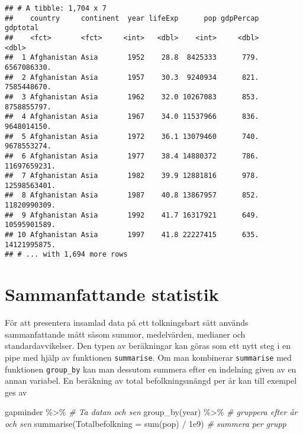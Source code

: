 \documentclass[
]{book}
\newenvironment{Shaded}{\begin{snugshade}}{\end{snugshade}}
\newcommand{\AttributeTok}[1]{\textcolor[rgb]{0.77,0.63,0.00}{#1}}
\newcommand{\CommentTok}[1]{\textcolor[rgb]{0.56,0.35,0.01}{\textit{#1}}}
\newcommand{\FloatTok}[1]{\textcolor[rgb]{0.00,0.00,0.81}{#1}}
\newcommand{\FunctionTok}[1]{\textcolor[rgb]{0.00,0.00,0.00}{#1}}
\newcommand{\NormalTok}[1]{#1}
\newcommand{\SpecialCharTok}[1]{\textcolor[rgb]{0.00,0.00,0.00}{#1}}
\theoremstyle{definition}
\theoremstyle{definition}
\theoremstyle{definition}
\theoremstyle{definition}
\theoremstyle{remark}
\begin{document}
\begin{verbatim}
## # A tibble: 1,704 x 7
##    country     continent  year lifeExp      pop gdpPercap     gdptotal
##    <fct>       <fct>     <int>   <dbl>    <int>     <dbl>        <dbl>
##  1 Afghanistan Asia       1952    28.8  8425333      779.  6567086330.
##  2 Afghanistan Asia       1957    30.3  9240934      821.  7585448670.
##  3 Afghanistan Asia       1962    32.0 10267083      853.  8758855797.
##  4 Afghanistan Asia       1967    34.0 11537966      836.  9648014150.
##  5 Afghanistan Asia       1972    36.1 13079460      740.  9678553274.
##  6 Afghanistan Asia       1977    38.4 14880372      786. 11697659231.
##  7 Afghanistan Asia       1982    39.9 12881816      978. 12598563401.
##  8 Afghanistan Asia       1987    40.8 13867957      852. 11820990309.
##  9 Afghanistan Asia       1992    41.7 16317921      649. 10595901589.
## 10 Afghanistan Asia       1997    41.8 22227415      635. 14121995875.
## # ... with 1,694 more rows
\end{verbatim}

\hypertarget{sammanfattande-statistik}{%
\section{Sammanfattande statistik}\label{sammanfattande-statistik}}

För att presentera insamlad data på ett tolkningsbart sätt används sammanfattande mått såsom summor, medelvärden, medianer och standardavvikelser.
Den typen av beräkningar kan göras som ett nytt steg i en pipe med hjälp av funktionen \texttt{summarise}. Om man kombinerar \texttt{summarise} med funktionen \texttt{group\_by} kan man dessutom summera efter en indelning given av en annan variabel. En beräkning av total befolkningsmängd per år kan till exempel ges av

\begin{Shaded}
\begin{Highlighting}[]
\NormalTok{gapminder }\SpecialCharTok{\%\textgreater{}\%}                           \CommentTok{\# Ta datan och sen}
  \FunctionTok{group\_by}\NormalTok{(year) }\SpecialCharTok{\%\textgreater{}\%}                    \CommentTok{\# gruppera efter år och sen}
  \FunctionTok{summarise}\NormalTok{(}\AttributeTok{Totalbefolkning =} \FunctionTok{sum}\NormalTok{(pop) }\SpecialCharTok{/} \FloatTok{1e9}\NormalTok{) }\CommentTok{\# summera per grupp}
\end{Highlighting}
\end{Shaded}
\end{document}
